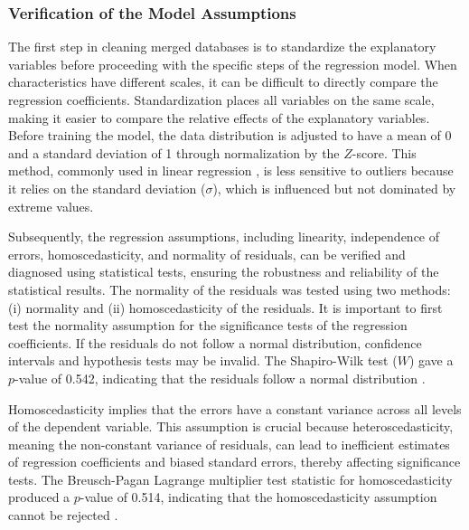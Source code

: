 \begin{refsegment}
\subsubsection*{Verification of the Model Assumptions
    \label{chap4:methodologie-hypotheses}
    }

The first step in cleaning merged databases is to standardize the explanatory variables before proceeding with the specific steps of the regression model. When characteristics have different scales, it can be difficult to directly compare the regression coefficients. Standardization places all variables on the same scale, making it easier to compare the relative effects of the explanatory variables. Before training the model, the data distribution is adjusted to have a mean of 0 and a standard deviation of 1 through normalization by the \(Z\)-score. This method, commonly used in linear regression \textcolor{blue}{\autocite{pearson_lines_1901}}, is less sensitive to outliers because it relies on the standard deviation ($\sigma$), which is influenced but not dominated by extreme values. %

Subsequently, the regression assumptions, including linearity, independence of errors, homoscedasticity, and normality of residuals, can be verified and diagnosed using statistical tests, ensuring the robustness and reliability of the statistical results. The normality of the residuals was tested using two methods: (i) normality and (ii) homoscedasticity of the residuals. It is important to first test the normality assumption for the significance tests of the regression coefficients. If the residuals do not follow a normal distribution, confidence intervals and hypothesis tests may be invalid. The Shapiro-Wilk test (\(W\)) gave a \(p\)-value of 0.542, indicating that the residuals follow a normal distribution \textcolor{blue}{\autocite{shapiro_analysis_1965}}. %

Homoscedasticity implies that the errors have a constant variance across all levels of the dependent variable. This assumption is crucial because heteroscedasticity, meaning the non-constant variance of residuals, can lead to inefficient estimates of regression coefficients and biased standard errors, thereby affecting significance tests. The Breusch-Pagan Lagrange multiplier test statistic for homoscedasticity produced a \(p\)-value of 0.514, indicating that the homoscedasticity assumption cannot be rejected \textcolor{blue}{\autocite{breusch_simple_1979}}. %


\end{refsegment}
